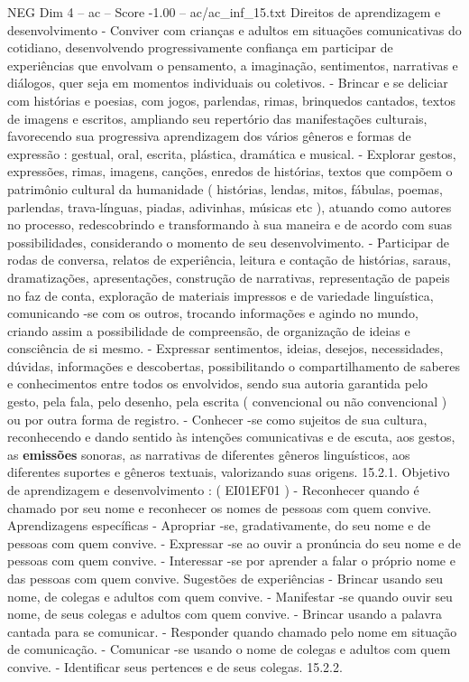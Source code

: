 \begin{textsample}{NEG Dim 4 – ac – Score -1.00 – ac/ac\_inf\_15.txt}
Direitos de aprendizagem e desenvolvimento - Conviver com crianças e adultos em situações comunicativas do cotidiano, desenvolvendo progressivamente confiança em participar de experiências que envolvam o pensamento, a imaginação, sentimentos, narrativas e diálogos, quer seja em momentos individuais ou coletivos. - Brincar e se deliciar com histórias e poesias, com jogos, parlendas, rimas, brinquedos cantados, textos de imagens e escritos, ampliando seu repertório das manifestações culturais, favorecendo sua progressiva aprendizagem dos vários gêneros e formas de expressão : gestual, oral, escrita, plástica, dramática e musical. - Explorar gestos, expressões, rimas, imagens, canções, enredos de histórias, textos que compõem o patrimônio cultural da humanidade ( histórias, lendas, mitos, fábulas, poemas, parlendas, trava-línguas, piadas, adivinhas, músicas etc ), atuando como autores no processo, redescobrindo e transformando à sua maneira e de acordo com suas possibilidades, considerando o momento de seu desenvolvimento. - Participar de rodas de conversa, relatos de experiência, leitura e contação de histórias, saraus, dramatizações, apresentações, construção de narrativas, representação de papeis no faz de conta, exploração de materiais impressos e de variedade linguística, comunicando -se com os outros, trocando informações e agindo no mundo, criando assim a possibilidade de compreensão, de organização de ideias e consciência de si mesmo. - Expressar sentimentos, ideias, desejos, necessidades, dúvidas, informações e descobertas, possibilitando o compartilhamento de saberes e conhecimentos entre todos os envolvidos, sendo sua autoria garantida pelo gesto, pela fala, pelo desenho, pela escrita ( convencional ou não convencional ) ou por outra forma de registro. - Conhecer -se como sujeitos de sua cultura, reconhecendo e dando sentido às intenções comunicativas e de escuta, aos gestos, as \textbf{emissões} sonoras, as narrativas de diferentes gêneros linguísticos, aos diferentes suportes e gêneros textuais, valorizando suas origens. 15.2.1.
Objetivo de aprendizagem e desenvolvimento : ( EI01EF01 ) - Reconhecer quando é chamado por seu nome e reconhecer os nomes de pessoas com quem convive.
Aprendizagens específicas - Apropriar -se, gradativamente, do seu nome e de pessoas com quem convive. - Expressar -se ao ouvir a pronúncia do seu nome e de pessoas com quem convive. - Interessar -se por aprender a falar o próprio nome e das pessoas com quem convive.
Sugestões de experiências - Brincar usando seu nome, de colegas e adultos com quem convive. - Manifestar -se quando ouvir seu nome, de seus colegas e adultos com quem convive. - Brincar usando a palavra cantada para se comunicar. - Responder quando chamado pelo nome em situação de comunicação. - Comunicar -se usando o nome de colegas e adultos com quem convive. - Identificar seus pertences e de seus colegas. 15.2.2.

\end{textsample}
